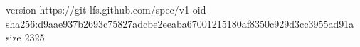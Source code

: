 version https://git-lfs.github.com/spec/v1
oid sha256:d9aae937b2693c75827adcbe2eeaba67001215180af8350c929d3cc3955ad91a
size 2325
